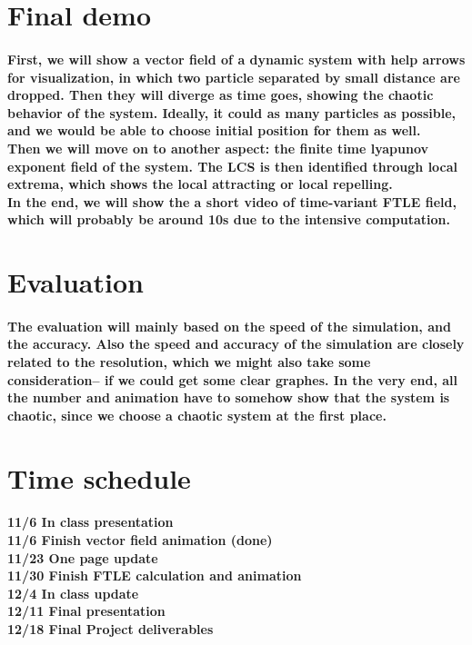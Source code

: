 \documentclass[12pt]{article}
\begin{document}
\section{Final demo}
\paragraph{
\indent First, we will show a vector field of a dynamic system with help arrows for visualization, in which two particle separated by small distance are dropped. Then they will diverge as time goes, showing the chaotic behavior of the system. Ideally, it could as many particles as possible, and we would be able to choose initial position for them as well. \\
\indent Then we will move on to another aspect: the finite time lyapunov exponent field of the system. The LCS is then identified through local extrema, which shows the local attracting or local repelling. \\
\indent In the end, we will show the  a short video of time-variant FTLE field, which will probably be around 10s due to 
the intensive computation. \\
}


\section{Evaluation}
\paragraph{
\indent The evaluation will mainly based on the speed of the simulation, and the accuracy. Also the speed and accuracy of the simulation are closely related to the resolution, which we might also take some consideration-- if we could get some clear graphes. In the very end, all the number and animation have to somehow show that the system is chaotic, since we choose a chaotic system at the first place.  \\
}


\section{Time schedule}
\paragraph{
	11/6		In class presentation \\
	11/6		Finish vector field animation	(done) \\
	11/23		One page update  \\
	11/30		Finish FTLE calculation and animation \\
	12/4		In class update  \\
	12/11		Final presentation  \\
	12/18		Final Project deliverables  \\
}
\end{document}
